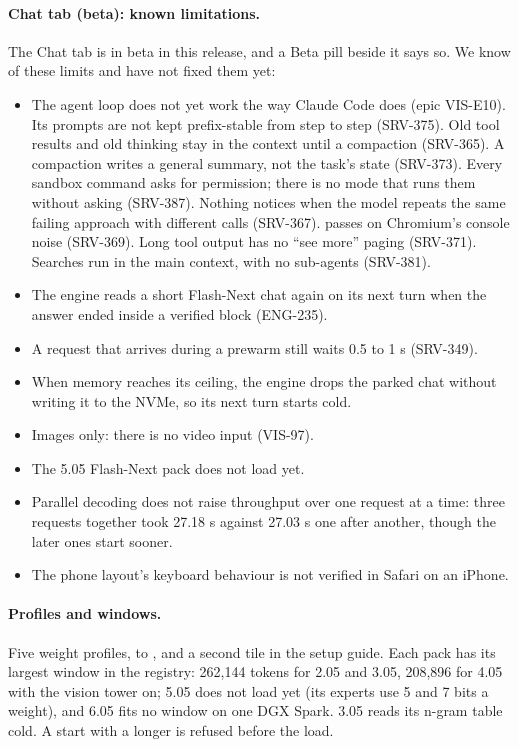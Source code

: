 \paragraph{Chat tab (beta): known limitations.} The Chat tab is in beta in this release, and a Beta pill beside it says so. We know of these limits and have not fixed them yet:
\begin{itemize}
  \item The agent loop does not yet work the way Claude Code does (epic VIS-E10). Its prompts are not kept prefix-stable from step to step (SRV-375). Old tool results and old thinking stay in the context until a compaction (SRV-365). A compaction writes a general summary, not the task's state (SRV-373). Every sandbox command asks for permission; there is no mode that runs them without asking (SRV-387). Nothing notices when the model repeats the same failing approach with different calls (SRV-367).  passes on Chromium's console noise (SRV-369). Long tool output has no ``see more'' paging (SRV-371). Searches run in the main context, with no sub-agents (SRV-381).
  \item The engine reads a short Flash-Next chat again on its next turn when the answer ended inside a verified block (ENG-235).
  \item A request that arrives during a prewarm still waits 0.5 to 1 s (SRV-349).
  \item When memory reaches its ceiling, the engine drops the parked chat without writing it to the NVMe, so its next turn starts cold.
  \item Images only: there is no video input (VIS-97).
  \item The 5.05 Flash-Next pack does not load yet.
  \item Parallel decoding does not raise throughput over one request at a time: three requests together took 27.18 s against 27.03 s one after another, though the later ones start sooner.
  \item The phone layout's keyboard behaviour is not verified in Safari on an iPhone.
\end{itemize}


\paragraph{Profiles and windows.} Five weight profiles,  to , and a second tile in the setup guide. Each pack has its largest window in the registry: 262,144 tokens for 2.05 and 3.05, 208,896 for 4.05 with the vision tower on; 5.05 does not load yet (its experts use 5 and 7 bits a weight), and 6.05 fits no window on one DGX Spark. 3.05 reads its n-gram table cold. A start with a longer  is refused before the load.

